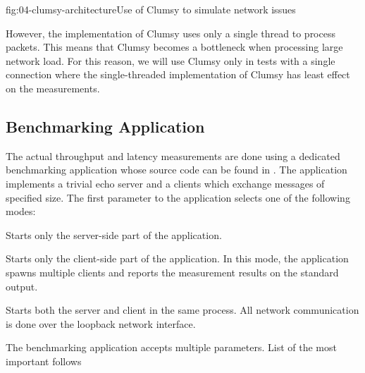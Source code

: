 \begin{myFigure}{fig:04-clumsy-architecture}{Use of Clumsy to simulate network issues}

  \resizebox{0.8\linewidth}{!}{}

\end{myFigure}

However, the implementation of Clumsy uses only a single thread to process packets. This means that
Clumsy becomes a bottleneck when processing large network load. For this reason, we will use Clumsy
only in tests with a single connection where the single-threaded implementation of Clumsy has least
effect on the measurements.

\subsection{Benchmarking Application}\label{sec:04-benchmark-app}

The actual throughput and latency measurements are done using a dedicated benchmarking \dotnet{}
application whose source code can be found in . The application implements
a trivial echo server and a clients which exchange messages of specified size. The first parameter
to the application selects one of the following modes:

\begin{description}

   Starts only the server-side part of the application.

   Starts only the client-side part of the application. In this mode, the
application spawns multiple clients and reports the measurement results on the standard output.

   Starts both the server and client in the same process. All network
communication is done over the loopback network interface.

\end{description}

The benchmarking application accepts multiple parameters. List of the most important follows

